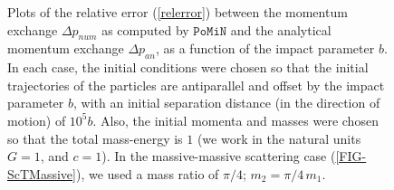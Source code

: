 \documentclass[aps,onecolumn,notitlepage,eqsecnum,nofootinbib,floatfix,superscriptaddress]{revtex4-1}
\newcommand{\codename}{\mathtt{PoMiN}}
\begin{document}
\begin{figure}

\hfill
{}
\caption{Plots of the relative error (\ref{relerror}) between the momentum exchange $\Delta p_{num}$ as computed by $\codename$ and the analytical momentum exchange $\Delta p_{an}$, as a function of the impact parameter $b$. In each case, the initial conditions were chosen so that the initial trajectories of the particles are antiparallel and offset by the impact parameter $b$, with an initial separation distance (in the direction of motion) of $10^5 b$. Also, the initial momenta and masses were chosen so that the total mass-energy is $1$ (we work in the natural units $G=1$, and $c=1$). In the massive-massive scattering case (\ref{FIG-ScTMassive}), we used a mass ratio of $\pi/4$; $m_2= \pi / 4 \, m_1$.}
\label{FIG-ScatteringTestsRelativeError}
\end{figure}
\end{document}
